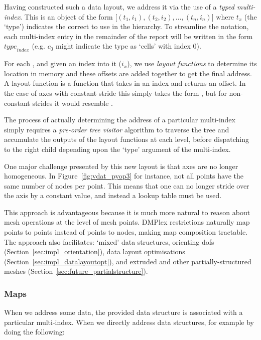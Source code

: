 Having constructed such a data layout, we address it via the use of a \textit{typed multi-index}.
This is an object of the form $\big[(t_1, i_1), (t_2, i_2), \dots, (t_n, i_n)\big]$ where $t_x$ (the `type') indicates the correct  to use in the hierarchy.
To streamline the notation, each multi-index entry in the remainder of the report will be written in the form $\mathit{type}_{\mathit{index}}$ (e.g. $c_0$ might indicate the type as `cells' with index 0).

For each , and given an index into it ($i_x$), we use \textit{layout functions} to determine its location in memory and these offsets are added together to get the final address.
A layout function is a function that takes in an index and returns an offset.
In the case of axes with constant stride this simply takes the form , but for non-constant strides it would resemble .

The process of actually determining the address of a particular multi-index simply requires a \textit{pre-order tree visitor} algorithm to traverse the tree and accumulate the outputs of the layout functions at each level, before dispatching to the right child depending upon the `type' argument of the multi-index.

One major challenge presented by this new layout is that axes are no longer homogeneous.
In Figure~\ref{fig:vdat_pyop3} for instance, not all points have the same number of nodes per point.
This means that one can no longer stride over the axis by a constant value, and instead a lookup table must be used.

This approach is advantageous because it is much more natural to reason about mesh operations at the level of mesh points.
DMPlex restrictions naturally map points to points instead of points to nodes, making map composition tractable.
The approach also facilitates: `mixed' data structures, orienting \glspl{dof} (Section~\ref{sec:impl_orientation}), data layout optimisations (Section~\ref{sec:impl_datalayoutopt}), and extruded and other partially-structured meshes (Section~\ref{sec:future_partialstructure}).

\subsubsection{Maps}
\label{sec:impl_datalayout_maps}

When we address some data, the provided data structure is associated with a particular multi-index.
When we directly address data structures, for example by doing the following:

